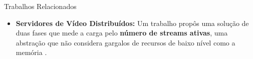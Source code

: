 \documentclass[10pt]{beamer}
\begin{document}
\begin{frame}[allowframebreaks]{Trabalhos Relacionados}
\begin{itemize}
    \item \textbf{Servidores de Vídeo Distribuídos:} Um trabalho propôs uma solução de duas fases que mede a carga pelo \textbf{número de streams ativas}, uma abstração que não considera gargalos de recursos de baixo nível como a memória \cite{dataAllocationAndDynamicLoadBalancingForDistributedVideoStorageServer1999}.
\end{itemize}

\end{frame}






\end{document}
